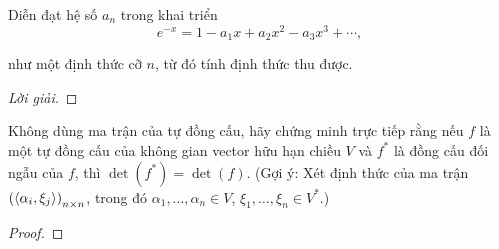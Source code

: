 \documentclass[class=linearalgebra,crop=false]{standalone}
\begin{document}
\begin{exercise}
    \par Diễn đạt hệ số $a_{n}$ trong khai triển
    \[
        e^{-x} = 1 - a_{1}x + a_{2}x^{2} - a_{3}x^{3} + \cdots ,
    \]
    \par như một định thức cỡ $n$, từ đó tính định thức thu được.
\end{exercise}

\begin{proof}[Lời giải]
\end{proof}

\begin{exercise}
    \par Không dùng ma trận của tự đồng cấu, hãy chứng minh trực tiếp rằng nếu $f$ là một tự đồng cấu của không gian vector hữu hạn chiều $V$ và $f^{*}$ là đồng cấu đối ngẫu của $f$, thì $\det(f^{*}) = \det(f)$. (Gợi ý: Xét định thức của ma trận $\left(\left\langle{\alpha_{i},\xi_{j}}\right\rangle\right)_{n\times n}$, trong đó $\alpha_{1},\ldots,\alpha_{n}\in V$, $\xi_{1},\ldots,\xi_{n}\in V^{*}$.)
\end{exercise}

\begin{proof}
\end{proof}
\end{document}
